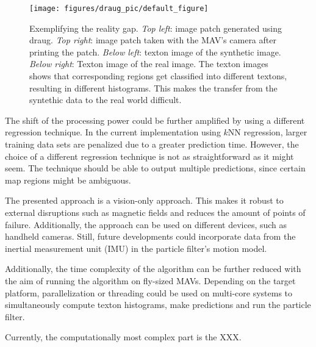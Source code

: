 \begin{figure}[h!]
\begin{center}
\texttt{[image: figures/draug\_pic/default\_figure]}
\caption{{\label{fig:realitygap} Exemplifying the reality
    gap. \emph{Top left}: image patch generated using draug. \emph{Top
      right}: image patch taken with the MAV's camera after printing
    the patch. \emph{Below left}: texton image of the synthetic
    image. \emph{Below right}: Texton image of the real image. The
    texton images shows that corresponding regions get classified into
    different textons, resulting in different histograms. This makes
    the transfer from the syntethic data to the real world difficult.%
}}
\end{center}
\end{figure}

The shift of the processing power could be further amplified by using
a different regression technique. In the current implementation using
$k$NN regression, larger training data sets are penalized due to a
greater prediction time. However, the choice of a different regression
technique is not as straightforward as it might seem. The technique
should be able to output multiple predictions, since certain map
regions might be ambiguous.

The presented approach is a vision-only approach. This makes it robust to external disruptions such as magnetic fields and reduces the amount of points of failure. Additionally, the approach can be used on different devices, such as handheld cameras. Still, future developments could incorporate data from the inertial measurement unit (IMU) in the
particle filter’s motion model.

Additionally, the time complexity of the algorithm can be further reduced with the aim of running the algorithm on
fly-sized MAVs. Depending on the target platform, parallelization or threading could be used on multi-core systems to simultaneously compute texton histograms, make predictions and run the particle filter.     

Currently, the computationally most complex part is the XXX.
